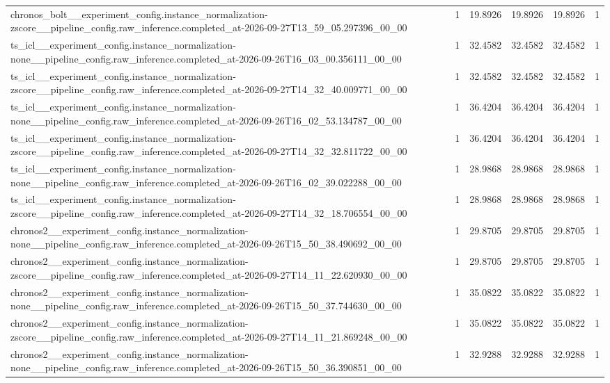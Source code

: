 \begin{tabular}{llllll}
chronos\_bolt\_\_experiment\_config.instance\_normalization-zscore\_\_pipeline\_config.raw\_inference.completed\_at-2026-09-27T13\_59\_05.297396\_00\_00 & 1 & 19.8926 & 19.8926 & 19.8926 & 1 \\
ts\_icl\_\_experiment\_config.instance\_normalization-none\_\_pipeline\_config.raw\_inference.completed\_at-2026-09-26T16\_03\_00.356111\_00\_00 & 1 & 32.4582 & 32.4582 & 32.4582 & 1 \\
ts\_icl\_\_experiment\_config.instance\_normalization-zscore\_\_pipeline\_config.raw\_inference.completed\_at-2026-09-27T14\_32\_40.009771\_00\_00 & 1 & 32.4582 & 32.4582 & 32.4582 & 1 \\
ts\_icl\_\_experiment\_config.instance\_normalization-none\_\_pipeline\_config.raw\_inference.completed\_at-2026-09-26T16\_02\_53.134787\_00\_00 & 1 & 36.4204 & 36.4204 & 36.4204 & 1 \\
ts\_icl\_\_experiment\_config.instance\_normalization-zscore\_\_pipeline\_config.raw\_inference.completed\_at-2026-09-27T14\_32\_32.811722\_00\_00 & 1 & 36.4204 & 36.4204 & 36.4204 & 1 \\
ts\_icl\_\_experiment\_config.instance\_normalization-none\_\_pipeline\_config.raw\_inference.completed\_at-2026-09-26T16\_02\_39.022288\_00\_00 & 1 & 28.9868 & 28.9868 & 28.9868 & 1 \\
ts\_icl\_\_experiment\_config.instance\_normalization-zscore\_\_pipeline\_config.raw\_inference.completed\_at-2026-09-27T14\_32\_18.706554\_00\_00 & 1 & 28.9868 & 28.9868 & 28.9868 & 1 \\
chronos2\_\_experiment\_config.instance\_normalization-none\_\_pipeline\_config.raw\_inference.completed\_at-2026-09-26T15\_50\_38.490692\_00\_00 & 1 & 29.8705 & 29.8705 & 29.8705 & 1 \\
chronos2\_\_experiment\_config.instance\_normalization-zscore\_\_pipeline\_config.raw\_inference.completed\_at-2026-09-27T14\_11\_22.620930\_00\_00 & 1 & 29.8705 & 29.8705 & 29.8705 & 1 \\
chronos2\_\_experiment\_config.instance\_normalization-none\_\_pipeline\_config.raw\_inference.completed\_at-2026-09-26T15\_50\_37.744630\_00\_00 & 1 & 35.0822 & 35.0822 & 35.0822 & 1 \\
chronos2\_\_experiment\_config.instance\_normalization-zscore\_\_pipeline\_config.raw\_inference.completed\_at-2026-09-27T14\_11\_21.869248\_00\_00 & 1 & 35.0822 & 35.0822 & 35.0822 & 1 \\
chronos2\_\_experiment\_config.instance\_normalization-none\_\_pipeline\_config.raw\_inference.completed\_at-2026-09-26T15\_50\_36.390851\_00\_00 & 1 & 32.9288 & 32.9288 & 32.9288 & 1 \\

\end{tabular}
